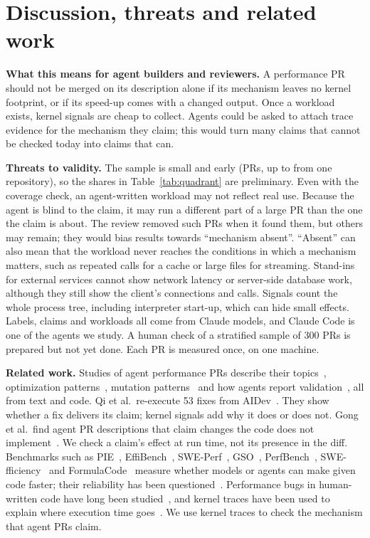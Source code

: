 \section{Discussion, threats and related work}
\label{sec:discussion}

\textbf{What this means for agent builders and reviewers.} A performance
PR should not be merged on its description alone if its mechanism leaves
no kernel footprint, or if its speed-up comes with a changed output. Once
a workload exists, kernel signals are cheap to collect. Agents could be
asked to attach trace evidence for the mechanism they claim; this would
turn many claims that cannot be checked today into claims that can.

\textbf{Threats to validity.} The sample is small and early (\nAnalysed PRs,
up to \maxPerRepo from one repository), so the shares in
Table~\ref{tab:quadrant} are preliminary. Even with the coverage check, an
agent-written workload may not reflect real use. Because the agent is blind to the claim, it may run a different part
of a large PR than the one the claim is about. The review removed such
PRs when it found them, but others may remain; they would bias results
towards ``mechanism absent''. ``Absent'' can also mean that the workload
never reaches the conditions in which a mechanism matters, such as
repeated calls for a cache or large files for streaming. Stand-ins for
external services cannot show network latency or server-side database
work, although they still show the client's connections and calls. Signals
count the whole process tree, including interpreter start-up, which can
hide small effects. Labels, claims and workloads all come from Claude
models, and Claude Code is one of the agents we study. A human check of a
stratified sample of 300 PRs is prepared but not yet done. Each PR is measured once, on one machine.

\textbf{Related work.} Studies of agent performance PRs describe their
topics~\cite{opu2025bertopic}, optimization
patterns~\cite{peng2025optimization}, mutation
patterns~\cite{dovhoshliubnyi2026mutation} and how agents report
validation~\cite{peng2026validation}, all from text and code. Qi et al.\
re-execute 53 fixes from AIDev~\cite{qi2026merged}. They show whether a
fix delivers its claim; kernel signals add why it does or does not. Gong
et al.\ find agent PR descriptions that claim changes the code does not
implement~\cite{gong2026inconsistency}. We check a claim's effect at run
time, not its presence in the diff. Benchmarks such as
PIE~\cite{shypula2024pie}, EffiBench~\cite{huang2024effibench},
SWE-Perf~\cite{he2025sweperf}, GSO~\cite{shetty2025gso},
PerfBench~\cite{garg2025perfbench}, SWE-fficiency~\cite{ma2025swefficiency}
and FormulaCode~\cite{sehgal2026formulacode} measure whether models or
agents can make given code faster; their reliability has been
questioned~\cite{chen2026benchmarks}. Performance bugs in human-written
code have long been studied~\cite{jin2012perfbugs,zaman2012perfbugs}, and
kernel traces have been used to explain where execution time
goes~\cite{giraldeau2016wait,ezzatijivan2017multiscale}. We use kernel
traces to check the mechanism that agent PRs claim.

